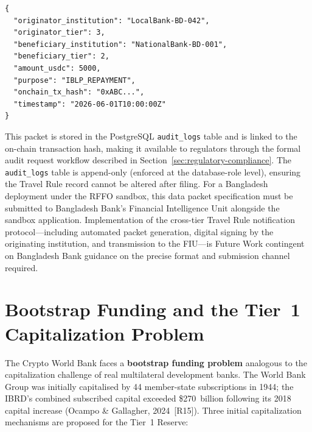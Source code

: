 \documentclass[12pt,a4paper]{report}
\begin{document}
\begin{verbatim}
{
  "originator_institution": "LocalBank-BD-042",
  "originator_tier": 3,
  "beneficiary_institution": "NationalBank-BD-001",
  "beneficiary_tier": 2,
  "amount_usdc": 5000,
  "purpose": "IBLP_REPAYMENT",
  "onchain_tx_hash": "0xABC...",
  "timestamp": "2026-06-01T10:00:00Z"
}
\end{verbatim}

\noindent This packet is stored in the PostgreSQL \texttt{audit\_logs} table and is linked to the on-chain transaction hash, making it available to regulators through the formal audit request workflow described in Section~\ref{sec:regulatory-compliance}. The \texttt{audit\_logs} table is append-only (enforced at the database-role level), ensuring the Travel Rule record cannot be altered after filing. For a Bangladesh deployment under the RFFO sandbox, this data packet specification must be submitted to Bangladesh Bank's Financial Intelligence Unit alongside the sandbox application. Implementation of the cross-tier Travel Rule notification protocol---including automated packet generation, digital signing by the originating institution, and transmission to the FIU---is Future Work contingent on Bangladesh Bank guidance on the precise format and submission channel required.

\section{Bootstrap Funding and the Tier~1 Capitalization Problem}

The Crypto World Bank faces a \textbf{bootstrap funding problem} analogous to the capitalization challenge of real multilateral development banks. The World Bank Group was initially capitalised by 44 member-state subscriptions in 1944; the IBRD's combined subscribed capital exceeded \$270~billion following its 2018 capital increase (Ocampo \& Gallagher, 2024~[R15]). Three initial capitalization mechanisms are proposed for the Tier~1 Reserve:
\end{document}
